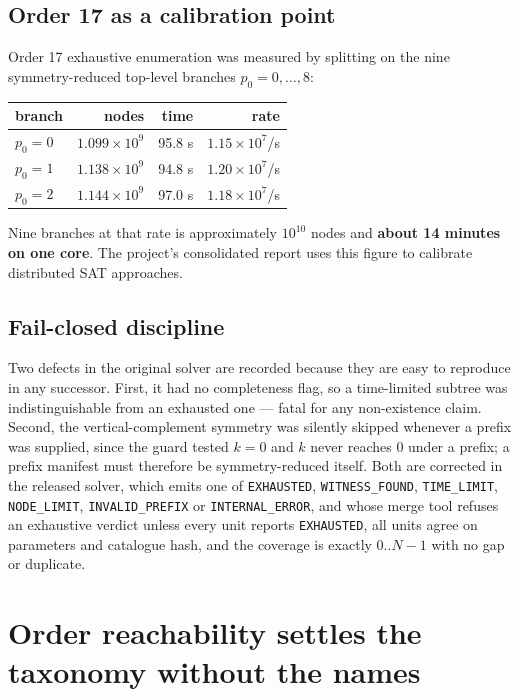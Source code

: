 \documentclass[11pt,a4paper,oneside]{report}
\theoremstyle{definition}
\begin{document}
\subsection{Order 17 as a calibration point}

Order 17 exhaustive enumeration was measured by splitting on the nine
symmetry-reduced top-level branches $p_0 = 0,\dots,8$:

\begin{center}
\begin{tabular}{@{}lrrr@{}}
\toprule
branch & nodes & time & rate \\
\midrule
$p_0=0$ & $1.099\times10^9$ & 95.8 s & $1.15\times10^7$/s \\
$p_0=1$ & $1.138\times10^9$ & 94.8 s & $1.20\times10^7$/s \\
$p_0=2$ & $1.144\times10^9$ & 97.0 s & $1.18\times10^7$/s \\
\bottomrule
\end{tabular}
\end{center}

Nine branches at that rate is approximately $10^{10}$ nodes and
\textbf{about 14 minutes on one core}. The project's consolidated report uses this figure to calibrate distributed SAT approaches.

\subsection{Fail-closed discipline}\label{p1-sec:discipline}

Two defects in the original solver are recorded because they are easy to
reproduce in any successor. First, it had no completeness flag, so a
time-limited subtree was indistinguishable from an exhausted one --- fatal for
any non-existence claim. Second, the vertical-complement symmetry was silently
skipped whenever a prefix was supplied, since the guard tested $k=0$ and $k$
never reaches 0 under a prefix; a prefix manifest must therefore be
symmetry-reduced itself. Both are corrected in the released solver, which emits
one of \texttt{EXHAUSTED}, \texttt{WITNESS\_FOUND}, \texttt{TIME\_LIMIT},
\texttt{NODE\_LIMIT}, \texttt{INVALID\_PREFIX} or \texttt{INTERNAL\_ERROR}, and
whose merge tool refuses an exhaustive verdict unless every unit reports
\texttt{EXHAUSTED}, all units agree on parameters and catalogue hash, and the
coverage is exactly $0..N{-}1$ with no gap or duplicate.

\section{Order reachability settles the taxonomy without the names}
\label{p1-sec:reachability}
\end{document}
